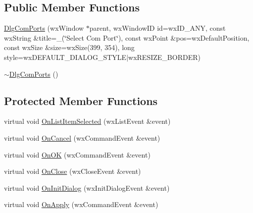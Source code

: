 \subsection*{Public Member Functions}
\begin{DoxyCompactItemize}
\item 
\hyperlink{class_dlg_com_ports_a2e059ff99dc69db797823fca6b053035}{Dlg\-Com\-Ports} (wx\-Window $\ast$parent, wx\-Window\-I\-D id=wx\-I\-D\-\_\-\-A\-N\-Y, const wx\-String \&title=\-\_\-(\char`\"{}Select Com Port\char`\"{}), const wx\-Point \&pos=wx\-Default\-Position, const wx\-Size \&size=wx\-Size(399, 354), long style=wx\-D\-E\-F\-A\-U\-L\-T\-\_\-\-D\-I\-A\-L\-O\-G\-\_\-\-S\-T\-Y\-L\-E$|$wx\-R\-E\-S\-I\-Z\-E\-\_\-\-B\-O\-R\-D\-E\-R)
\item 
\hyperlink{class_dlg_com_ports_aab813718c07dcf72de770255302c214c}{$\sim$\-Dlg\-Com\-Ports} ()
\end{DoxyCompactItemize}
\subsection*{Protected Member Functions}
\begin{DoxyCompactItemize}
\item 
virtual void \hyperlink{class_dlg_com_ports_a1a4cc254a36227c69954b7e7dabf3efc}{On\-List\-Item\-Selected} (wx\-List\-Event \&event)
\item 
virtual void \hyperlink{class_dlg_com_ports_a2ac050bfb10f016b99b07a37ef2b5e86}{On\-Cancel} (wx\-Command\-Event \&event)
\item 
virtual void \hyperlink{class_dlg_com_ports_ab6809c6639748851d77029d39596f6de}{On\-O\-K} (wx\-Command\-Event \&event)
\item 
virtual void \hyperlink{class_dlg_com_ports_ae0b3539e9cd3b2903d9235ec93180479}{On\-Close} (wx\-Close\-Event \&event)
\item 
virtual void \hyperlink{class_dlg_com_ports_a1c2a230b1a95b8390251d54b0735d2b5}{On\-Init\-Dialog} (wx\-Init\-Dialog\-Event \&event)
\item 
virtual void \hyperlink{class_dlg_com_ports_acf4018858127924affbf163ac09b6ed9}{On\-Apply} (wx\-Command\-Event \&event)
\end{DoxyCompactItemize}

